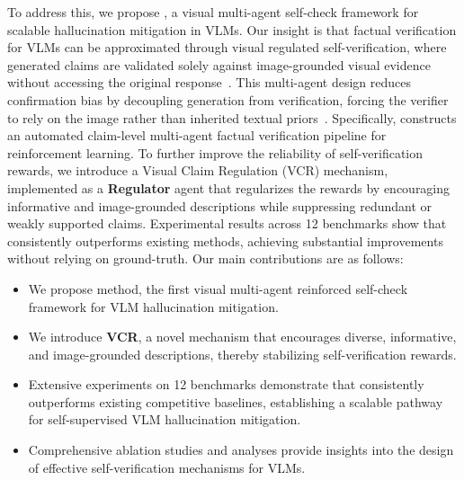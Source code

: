 To address this, we propose \textbf{\ours}, a visual multi-agent self-check framework for scalable hallucination mitigation in VLMs.
Our insight is that factual verification for VLMs can be approximated through visual regulated self-verification, where generated claims are validated solely against image-grounded visual evidence without accessing the original response~\cite{madaan2023self,li2026march}.
This multi-agent design reduces confirmation bias by decoupling generation from verification, forcing the verifier to rely on the image rather than inherited textual priors~\cite{stechly2025self,jhaveri2026failing}.
% 
Specifically, \ours constructs an automated claim-level multi-agent factual verification pipeline for reinforcement learning. 
To further improve the reliability of self-verification rewards, we introduce a Visual Claim Regulation (VCR) mechanism, implemented as a \textbf{Regulator} agent that regularizes the rewards by encouraging informative and image-grounded descriptions while suppressing redundant or weakly supported claims.
Experimental results across 12 benchmarks show that \ours consistently outperforms existing methods, achieving substantial improvements without relying on ground-truth.
Our main contributions are as follows:
\begin{itemize}
    \setlength{\itemsep}{0pt}
    \setlength{\topsep}{1pt}
    \item We propose \textbf{\ours} method, the first visual multi-agent reinforced self-check framework for VLM hallucination mitigation.
    \item We introduce \textbf{VCR}, a novel mechanism that encourages diverse, informative, and image-grounded descriptions, thereby stabilizing self-verification rewards.
    \item Extensive experiments on 12 benchmarks demonstrate that \ours consistently outperforms existing competitive baselines, establishing a scalable pathway for self-supervised VLM hallucination mitigation.
    \item Comprehensive ablation studies and analyses provide insights into the design of effective self-verification mechanisms for VLMs.
\end{itemize}
